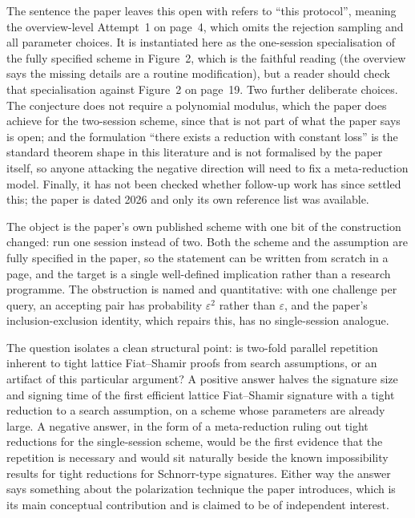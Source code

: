 \documentclass{aicr-conjecture}
\begin{document}
\begin{remark}\label{rem:readings}
The sentence the paper leaves this open with refers to ``this
protocol'', meaning the overview-level Attempt~1 on page~4, which omits
the rejection sampling and all parameter choices. It is instantiated
here as the one-session specialisation of the fully specified scheme in
Figure~2, which is the faithful reading (the overview says the missing
details are a routine modification), but a reader should check that
specialisation against Figure~2 on page~19. Two further deliberate
choices. The conjecture does not require a polynomial modulus, which
the paper does achieve for the two-session scheme, since that is not
part of what the paper says is open; and the formulation ``there exists
a reduction with constant loss'' is the standard theorem shape in this
literature and is not formalised by the paper itself, so anyone
attacking the negative direction will need to fix a meta-reduction
model. Finally, it has not been checked whether follow-up work has
since settled this; the paper is dated 2026 and only its own reference
list was available.
\end{remark}

\begin{remark}\label{rem:clean}
The object is the paper's own published scheme with one bit of the
construction changed: run one session instead of two. Both the scheme
and the assumption are fully specified in the paper, so the statement
can be written from scratch in a page, and the target is a single
well-defined implication rather than a research programme. The
obstruction is named and quantitative: with one challenge per query, an
accepting pair has probability $\varepsilon^2$ rather than
$\varepsilon$, and the paper's inclusion-exclusion identity, which
repairs this, has no single-session analogue.
\end{remark}

\begin{remark}\label{rem:interest}
The question isolates a clean structural point: is two-fold parallel
repetition inherent to tight lattice Fiat--Shamir proofs from search
assumptions, or an artifact of this particular argument? A positive
answer halves the signature size and signing time of the first
efficient lattice Fiat--Shamir signature with a tight reduction to a
search assumption, on a scheme whose parameters are already large. A
negative answer, in the form of a meta-reduction ruling out tight
reductions for the single-session scheme, would be the first evidence
that the repetition is necessary and would sit naturally beside the
known impossibility results for tight reductions for Schnorr-type
signatures. Either way the answer says something about the polarization
technique the paper introduces, which is its main conceptual
contribution and is claimed to be of independent interest.
\end{remark}
\end{document}
